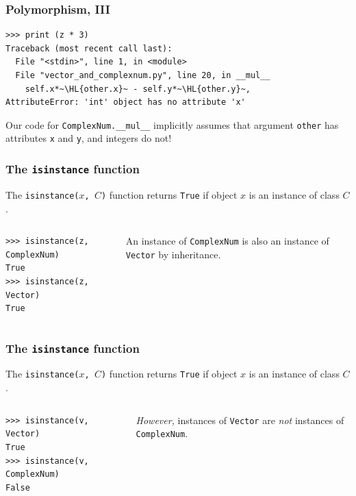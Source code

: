 \documentclass[english,serif,mathserif,xcolor=pdftex,dvipsnames,table]{beamer}
\begin{document}
\begin{frame}[fragile]
  \frametitle{Polymorphism, III}

\begin{lstlisting}
>>> print (z * 3)
Traceback (most recent call last):
  File "<stdin>", line 1, in <module>
  File "vector_and_complexnum.py", line 20, in __mul__
    self.x*~\HL{other.x}~ - self.y*~\HL{other.y}~,
AttributeError: 'int' object has no attribute 'x'
\end{lstlisting}

  \+ Our code for \lstinline|ComplexNum.__mul__| implicitly assumes
  that argument \lstinline|other| has attributes \texttt{x} and
  \texttt{y}, and integers do not!
\end{frame}


\begin{frame}[fragile]
  \frametitle{The \texttt{isinstance} function}
  The \texttt{isinstance($x$, $C$)} function returns \texttt{True} if
  object $x$ is an instance of class $C$.

  \+
  \begin{columns}
    \begin{column}{0.5\textwidth}
\begin{lstlisting}
>>> isinstance(z, ComplexNum)
True
>>> isinstance(z, Vector)
True
\end{lstlisting}
    \end{column}
    \begin{column}{0.4\textwidth}
      \raggedleft
      An instance of \texttt{ComplexNum} is also an instance of
      \texttt{Vector} by inheritance.
    \end{column}
  \end{columns}
\end{frame}


\begin{frame}[fragile]
  \frametitle{The \texttt{isinstance} function}
  The \texttt{isinstance($x$, $C$)} function returns \texttt{True} if
  object $x$ is an instance of class $C$.

  \+
  \begin{columns}
    \begin{column}{0.5\textwidth}
\begin{lstlisting}
>>> isinstance(v, Vector)
True
>>> isinstance(v, ComplexNum)
False
\end{lstlisting}
    \end{column}
    \begin{column}{0.5\textwidth}
      \raggedleft
      \emph{However,} instances of \texttt{Vector} are \emph{not}
      instances of \texttt{ComplexNum}.
    \end{column}
  \end{columns}
\end{frame}
\end{document}

